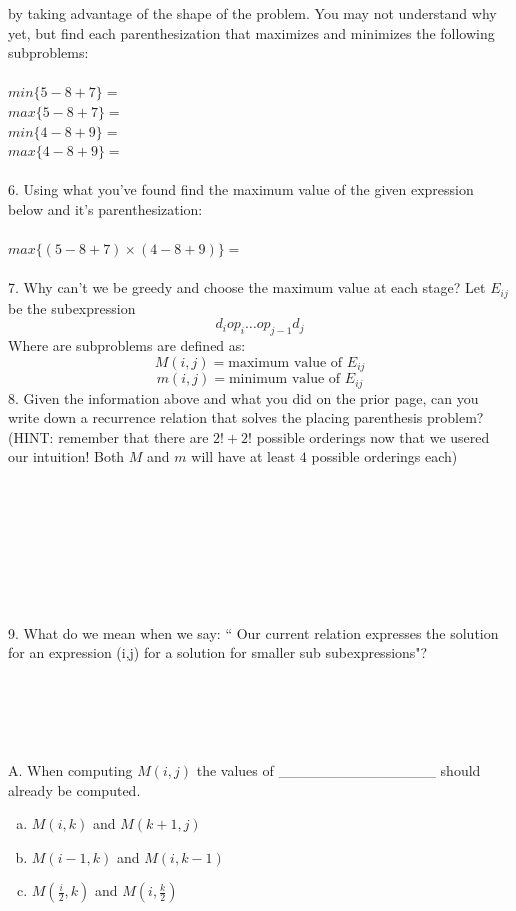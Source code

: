 \documentclass[12pt]{article}
\begin{document}
by taking advantage of the shape of the problem. You may not understand why yet, but find each
parenthesization that maximizes and minimizes the following subproblems:\\\\
$min\{5-8+7\}=$\\
$max\{5-8+7\}=$\\
$min\{4-8+9\}=$\\
$max\{4-8+9\}=$\\\\
6. Using what you've found 
find the maximum value of the given expression below
and it's parenthesization:\\\\
$max\{(5-8+7) \times (4-8+9)\}=$\\\\
7. Why can't we be greedy and choose the maximum value at each stage? 
\newpage
\noindent Let $E_{ij}$ be the subexpression
$$d_i op_i \dots op_{j-1}d_j$$
Where are subproblems are defined as:
$$M(i,j) = \text{maximum value of } E_{ij}$$
$$m(i,j) = \text{minimum value of } E_{ij}$$
8. Given the information above and what you did on the prior page, 
can you write down a recurrence relation that solves the placing 
parenthesis problem? (HINT: remember that there are $2! + 2!$ possible 
orderings now that we usered our intuition! Both $M$ and $m$ will
have at least $4$ possible orderings each)\\\\\\\\\\\\\\\\\\
9. What do we mean when we say: `` Our current relation expresses 
the solution for an expression (i,j) for a solution for smaller 
sub subexpressions"?\\\\\\\\\\\\
A. When computing $M(i,j)$ the values of _______________ 
should already be computed.
\begin{enumerate}[a)]
    \item $M(i,k)$ and $M(k+1,j)$
    \item $M(i-1,k)$ and  $M(i,k-1)$
    \item $M(\frac{i}{2},k)$ and  $M(i,\frac{k}{2})$
\end{enumerate}
\end{document}
